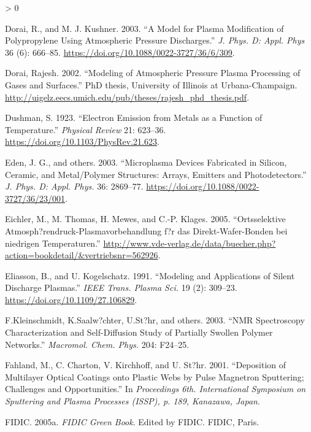 \documentclass[
  10pt,
  twoside]{article}
\newlength{\cslhangindent}
\newenvironment{CSLReferences}[2] %
 {%
  \setlength{\parindent}{0pt}
  \ifodd #1 \everypar{\setlength{\hangindent}{\cslhangindent}}\ignorespaces\fi
  \ifnum #2 > 0
  \setlength{\parskip}{#2\baselineskip}
  \fi
 }%
 {}
\begin{document}
\begin{CSLReferences}{1}{0}
\leavevmode\hypertarget{ref-Dora03}{}%
Dorai, R., and M. J. Kushner. 2003. {``A Model for Plasma Modification of Polypropylene Using Atmospheric Pressure Discharges.''} \emph{J. Phys. D: Appl. Phys} 36 (6): 666--85. \url{https://doi.org/10.1088/0022-3727/36/6/309}.

\leavevmode\hypertarget{ref-Dora02}{}%
Dorai, Rajesh. 2002. {``Modeling of Atmospheric Pressure Plasma Processing of Gases and Surfaces.''} PhD thesis, University of Illinois at Urbana-Champaign. \url{http://uigelz.eecs.umich.edu/pub/theses/rajesh_phd_thesis.pdf}.

\leavevmode\hypertarget{ref-Dush1923}{}%
Dushman, S. 1923. {``Electron Emission from Metals as a Function of Temperature.''} \emph{Physical Review} 21: 623--36. \url{https://doi.org/10.1103/PhysRev.21.623}.

\leavevmode\hypertarget{ref-Eden03}{}%
Eden, J. G., and others. 2003. {``Microplasma Devices Fabricated in Silicon, Ceramic, and Metal/Polymer Structures: Arrays, Emitters and Photodetectors.''} \emph{J. Phys. D: Appl. Phys.} 36: 2869--77. \url{https://doi.org/10.1088/0022-3727/36/23/001}.

\leavevmode\hypertarget{ref-Eich05}{}%
Eichler, M., M. Thomas, H. Mewes, and C.-P. Klages. 2005. {``{Ortsselektive Atmosph?rendruck-Plasmavorbehandlung f?r das Direkt-Wafer-Bonden bei niedrigen Temperaturen}.''} \url{http://www.vde-verlag.de/data/buecher.php?action=bookdetail/\&vertriebsnr=562926}.

\leavevmode\hypertarget{ref-Elia1991}{}%
Eliasson, B., and U. Kogelschatz. 1991. {``Modeling and Applications of Silent Discharge Plasmas.''} \emph{IEEE Trans. Plasma Sci.} 19 (2): 309--23. \url{https://doi.org/10.1109/27.106829}.

\leavevmode\hypertarget{ref-Klei03}{}%
F.Kleinschmidt, K.Saalw?chter, U.St?hr, and others. 2003. {``NMR Spectroscopy Characterization and Self-Diffusion Study of Partially Swollen Polymer Networks.''} \emph{Macromol. Chem. Phys.} 204: F24--25.

\leavevmode\hypertarget{ref-Fahl01}{}%
Fahland, M., C. Charton, V. Kirchhoff, and U. St?hr. 2001. {``Deposition of Multilayer Optical Coatings onto Plastic Webs by Pulse Magnetron Sputtering; Challenges and Opportunities.''} In \emph{Proceedings 6th. International Symposium on Sputtering and Plasma Processes (ISSP), p. 189, Kanazawa, Japan}.

\leavevmode\hypertarget{ref-FIDICgreen}{}%
FIDIC. 2005a. \emph{FIDIC Green Book}. Edited by FIDIC. FIDIC, Paris.


\end{CSLReferences}
\end{document}
